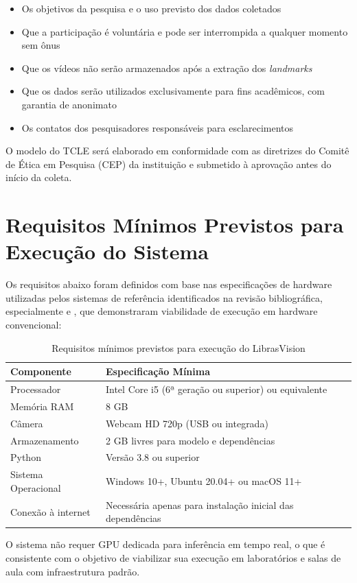 \begin{itemize}
    \item Os objetivos da pesquisa e o uso previsto dos dados coletados
    \item Que a participação é voluntária e pode ser interrompida a qualquer momento sem ônus
    \item Que os vídeos não serão armazenados após a extração dos \textit{landmarks}
    \item Que os dados serão utilizados exclusivamente para fins acadêmicos, com garantia de anonimato
    \item Os contatos dos pesquisadores responsáveis para esclarecimentos
\end{itemize}

O modelo do TCLE será elaborado em conformidade com as diretrizes do Comitê de Ética em Pesquisa (CEP) da instituição e submetido à aprovação antes do início da coleta.

\section{Requisitos Mínimos Previstos para Execução do Sistema}

Os requisitos abaixo foram definidos com base nas especificações de hardware utilizadas pelos sistemas de referência identificados na revisão bibliográfica, especialmente  e , que demonstraram viabilidade de execução em hardware convencional:

\begin{table}[htb]
    \centering
    \caption{Requisitos mínimos previstos para execução do LibrasVision}
    \label{tab:requisitos_sistema}
    \begin{tabular}{|l|l|}
        \hline
        \textbf{Componente} & \textbf{Especificação Mínima} \\
        \hline
        Processador & Intel Core i5 (6ª geração ou superior) ou equivalente \\
        Memória RAM & 8 GB \\
        Câmera & Webcam HD 720p (USB ou integrada) \\
        Armazenamento & 2 GB livres para modelo e dependências \\
        Python & Versão 3.8 ou superior \\
        Sistema Operacional & Windows 10+, Ubuntu 20.04+ ou macOS 11+ \\
        Conexão à internet & Necessária apenas para instalação inicial das dependências \\
        \hline
    \end{tabular}
\end{table}

O sistema não requer GPU dedicada para inferência em tempo real, o que é consistente com o objetivo de viabilizar sua execução em laboratórios e salas de aula com infraestrutura padrão.
